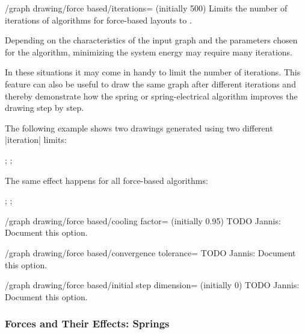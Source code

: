 \begin{key}{/graph drawing/force based/iterations=
  (initially 500)}
  Limits the number of iterations of algorithms for force-based
  layouts to . 

  Depending on the characteristics of the input graph and the parameters
  chosen for the algorithm, minimizing the system energy may require
  many iterations. 

  In these situations it may come in handy to limit the number of
  iterations. This feature can also be useful to draw the same graph
  after different iterations and thereby demonstrate how the spring or
  spring-electrical algorithm improves the drawing step by step.

  The following example shows two drawings generated using two
  different |iteration| limits: 
\begin{codeexample}[]
\tikz {};
\tikz {};
\end{codeexample}

  The same effect happens for all force-based algorithms:
\begin{codeexample}[width=5cm]
\tikz {};
\tikz {};
\end{codeexample}
\end{key}


\begin{key}{/graph drawing/force based/cooling factor=
    (initially 0.95)}
  TODO Jannis: Document this option.
\end{key}

\begin{key}{/graph drawing/force based/convergence tolerance=}
  TODO Jannis: Document this option.
\end{key}

\begin{key}{/graph drawing/force based/initial step dimension= (initially 0)}
  TODO Jannis: Document this option.
\end{key}


\subsubsection{Forces and Their Effects: Springs}

